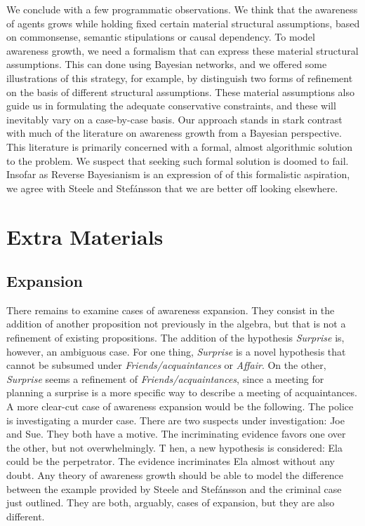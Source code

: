 \documentclass[
  11pt,
  dvipsnames,enabledeprecatedfontcommands]{scrartcl}
\begin{document}
We conclude with a few programmatic observations. We think that the
awareness of agents grows while holding fixed certain material
structural assumptions, based on commonsense, semantic stipulations or
causal dependency. To model awareness growth, we need a formalism that
can express these material structural assumptions. This can done using
Bayesian networks, and we offered some illustrations of this strategy,
for example, by distinguish two forms of refinement on the basis of
different structural assumptions. These material assumptions also guide
us in formulating the adequate conservative constraints, and these will
inevitably vary on a case-by-case basis. Our approach stands in stark
contrast with much of the literature on awareness growth from a Bayesian
perspective. This literature is primarily concerned with a formal,
almost algorithmic solution to the problem. We suspect that seeking such
formal solution is doomed to fail. Insofar as Reverse Bayesianism is an
expression of of this formalistic aspiration, we agree with Steele and
Stefánsson that we are better off looking elsewhere.

\hypertarget{extra-materials}{%
\section{Extra Materials}\label{extra-materials}}

\hypertarget{expansion}{%
\subsection{Expansion}\label{expansion}}

There remains to examine cases of awareness expansion. They consist in
the addition of another proposition not previously in the algebra, but
that is not a refinement of existing propositions. The addition of the
hypothesis \textit{Surprise} is, however, an ambiguous case. For one
thing, \textit{Surprise} is a novel hypothesis that cannot be subsumed
under \textit{Friends/acquaintances} or \textit{Affair}. On the other,
\textit{Surprise} seems a refinement of \textit{Friends/acquaintances},
since a meeting for planning a surprise is a more specific way to
describe a meeting of acquaintances. A more clear-cut case of awareness
expansion would be the following. The police is investigating a murder
case. There are two suspects under investigation: Joe and Sue. They both
have a motive. The incriminating evidence favors one over the other, but
not overwhelmingly. T hen, a new hypothesis is considered: Ela could be
the perpetrator. The evidence incriminates Ela almost without any doubt.
Any theory of awareness growth should be able to model the difference
between the example provided by Steele and Stefánsson and the criminal
case just outlined. They are both, arguably, cases of expansion, but
they are also different.
\end{document}
